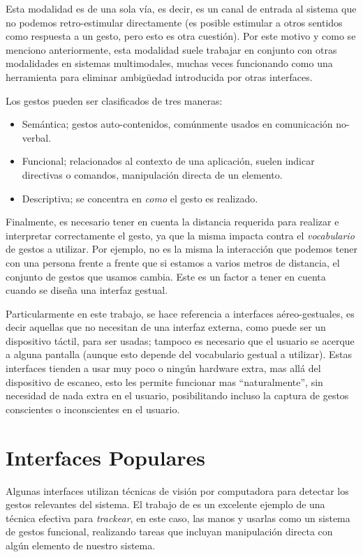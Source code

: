 Esta modalidad es de una sola vía, es decir, es un canal de entrada al sistema que no podemos retro-estimular directamente (es posible estimular a otros sentidos como respuesta a un gesto, pero esto es otra cuestión).
Por este motivo y como se menciono anteriormente, esta modalidad suele trabajar en conjunto con otras modalidades en sistemas multimodales, muchas veces funcionando como una herramienta para eliminar ambigüedad introducida por otras interfaces.
 
Los gestos pueden ser clasificados de tres maneras:
\begin{itemize}
\item Semántica; gestos auto-contenidos, comúnmente usados en comunicación no-verbal.
\item Funcional; relacionados al contexto de una aplicación, suelen indicar directivas o comandos, \eg manipulación directa de un elemento.
\item Descriptiva; se concentra en \emph{como} el gesto es realizado.
\end{itemize}

Finalmente, es necesario tener en cuenta la distancia requerida para realizar e interpretar correctamente el gesto, ya que la misma impacta contra el \textit{vocabulario} de gestos a utilizar. Por ejemplo, no es la misma la interacción que podemos tener con una persona frente a frente que si estamos a varios metros de distancia, el conjunto de gestos que usamos cambia. Este es un factor a tener en cuenta cuando se diseña una interfaz gestual.

Particularmente en este trabajo, se hace referencia a interfaces aéreo-gestuales, es decir aquellas que no necesitan de una interfaz externa, como puede ser un dispositivo táctil, para ser usadas; tampoco es necesario que el usuario se acerque a alguna pantalla (aunque esto depende del vocabulario gestual a utilizar). Estas interfaces tienden a usar muy poco o ningún hardware extra, mas allá del dispositivo de escaneo, esto les permite funcionar mas ``naturalmente'', \ie sin necesidad de nada extra en el usuario, posibilitando incluso la captura de gestos conscientes o inconscientes en el usuario.

\section{Interfaces Populares}
Algunas interfaces utilizan técnicas de visión por computadora para detectar los gestos  relevantes del sistema. El trabajo de \citet{wang2009real} es un excelente ejemplo de una técnica efectiva para \emph{trackear}, en este caso, las manos y usarlas como un sistema de gestos funcional, realizando tareas que incluyan manipulación directa con algún elemento de nuestro sistema. 

